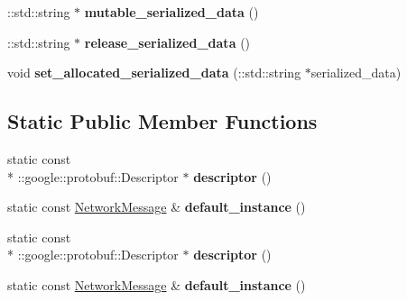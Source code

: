 \begin{DoxyCompactItemize}
\item 
\hypertarget{classSimpleChat_1_1NetworkMessage_a545fbed2c2b950761a9121432ee36071}{\-::std\-::string $\ast$ {\bfseries mutable\-\_\-serialized\-\_\-data} ()}\label{classSimpleChat_1_1NetworkMessage_a545fbed2c2b950761a9121432ee36071}

\item 
\hypertarget{classSimpleChat_1_1NetworkMessage_a381746122f4698cb44e937539d9c6ddf}{\-::std\-::string $\ast$ {\bfseries release\-\_\-serialized\-\_\-data} ()}\label{classSimpleChat_1_1NetworkMessage_a381746122f4698cb44e937539d9c6ddf}

\item 
\hypertarget{classSimpleChat_1_1NetworkMessage_ae47d82ed0348f240dfd418dcacd9f8da}{void {\bfseries set\-\_\-allocated\-\_\-serialized\-\_\-data} (\-::std\-::string $\ast$serialized\-\_\-data)}\label{classSimpleChat_1_1NetworkMessage_ae47d82ed0348f240dfd418dcacd9f8da}

\end{DoxyCompactItemize}
\subsection*{Static Public Member Functions}
\begin{DoxyCompactItemize}
\item 
\hypertarget{classSimpleChat_1_1NetworkMessage_a950c1e8d9d7f50956eabcd02a399c5b9}{static const \\*
\-::google\-::protobuf\-::\-Descriptor $\ast$ {\bfseries descriptor} ()}\label{classSimpleChat_1_1NetworkMessage_a950c1e8d9d7f50956eabcd02a399c5b9}

\item 
\hypertarget{classSimpleChat_1_1NetworkMessage_abbcdc7abd1b4c2ebdf8ce1ab683d3d03}{static const \hyperlink{classSimpleChat_1_1NetworkMessage}{Network\-Message} \& {\bfseries default\-\_\-instance} ()}\label{classSimpleChat_1_1NetworkMessage_abbcdc7abd1b4c2ebdf8ce1ab683d3d03}

\item 
\hypertarget{classSimpleChat_1_1NetworkMessage_a950c1e8d9d7f50956eabcd02a399c5b9}{static const \\*
\-::google\-::protobuf\-::\-Descriptor $\ast$ {\bfseries descriptor} ()}\label{classSimpleChat_1_1NetworkMessage_a950c1e8d9d7f50956eabcd02a399c5b9}

\item 
\hypertarget{classSimpleChat_1_1NetworkMessage_abbcdc7abd1b4c2ebdf8ce1ab683d3d03}{static const \hyperlink{classSimpleChat_1_1NetworkMessage}{Network\-Message} \& {\bfseries default\-\_\-instance} ()}\label{classSimpleChat_1_1NetworkMessage_abbcdc7abd1b4c2ebdf8ce1ab683d3d03}

\end{DoxyCompactItemize}
